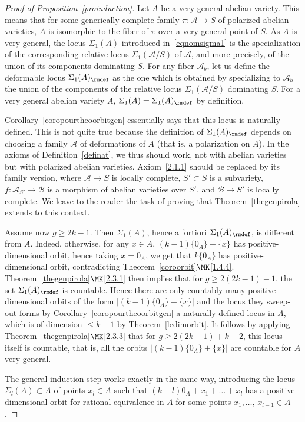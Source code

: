\begin{proof}[Proof of Proposition~\ref{proinduction}]
Let $A$ be a very general abelian variety. This means that for some generically complete family $\pi: \mathcal{A}\rightarrow S$ of polarized abelian varieties, $A$ is isomorphic to the fiber of $\pi$ over a very general point of $S$. As $A$ is very general, the locus $\Sigma_1(A)$ introduced in~\eqref{eqnomsigma1} is the specialization of the corresponding relative locus $\Sigma_1(\mathcal{A}/S)$ of $\mathcal{A}$, and more precisely, of the union of its components dominating $S$. For any fiber $\mathcal{A}_b$, let us define the deformable locus $\Sigma_1(A)_{\rmdef}$ as the one which is obtained by specializing to $\mathcal{A}_b$ the union of the components of the relative locus $\Sigma_1(\mathcal{A}/S)$ dominating $S$. For a very general abelian variety $A$, $\Sigma_1(A)=\Sigma_1(A)_{\rmdef}$ by definition.

Corollary~\ref{coropourtheoorbitgen} essentially says that this locus is naturally defined. This is not quite true because the definition of $\Sigma_1(A)_{\rmdef}$ depends on choosing a family $\mathcal{A}$ of deformations of $A$ (that is, a polarization on $A$). In the axioms of Definition~\ref{definat}, we thus should work, not with abelian varieties but with polarized abelian varieties. Axiom~\eqref{2.1.1} should be replaced by its family version, where $\mathcal{A}\rightarrow S$ is locally complete, $S'\subset S$ is a subvariety, $f:\mathcal{A}_{S'}\rightarrow \mathcal{B}$ is a morphism of abelian varieties over $S'$, and $\mathcal{B}\rightarrow {S'}$ is locally complete. We leave to the reader the task of proving that Theorem~\ref{thegenpirola} extends to this context.

Assume now $g\geq 2k-1$. Then $\Sigma_1(A)$, hence a fortiori $\Sigma_1(A)_{\rmdef}$, is different from $A$. Indeed, otherwise, for any $x\in A$, $(k-1)\{0_A\}+\{x\}$ has positive-dimensional orbit, hence taking $x=0_A$, we get that $k\{0_A\}$ has positive-dimensional orbit, contradicting Theorem~\ref{coroorbit}$\MK$\eqref{1.4.4}. Theorem~\ref{thegenpirola}$\MK$\eqref{2.3.1} then implies that for $g\geq 2(2k-1)-1$, the set $\Sigma_1(A)_{\rmdef}$ is countable. Hence there are only countably many positive-dimensional orbits of the form $|(k-1)\{0_A\}+\{x\}|$ and the locus they sweep-out forms by Corollary~\ref{coropourtheoorbitgen} a naturally defined locus in $A$, which is of dimension $\leq k-1$ by Theorem~\ref{ledimorbit}. It follows by applying Theorem~\ref{thegenpirola}$\MK$\eqref{2.3.3} that for $g\geq 2(2k-1)+k-2$, this locus itself is countable, that is, all the orbits $|(k-1)\{0_A\}+\{x\}|$ are countable for $A$ very general.

The general induction step works exactly in the same way, introducing the locus $\Sigma_l(A)\subset A$ of points $x_l\in A$ such that $(k-l)0_A+x_1+\dots+x_l$ has a positive-dimensional orbit for rational equivalence in $A$ for some points $x_1,\dots,\,x_{l-1}\in A$.
\end{proof}

